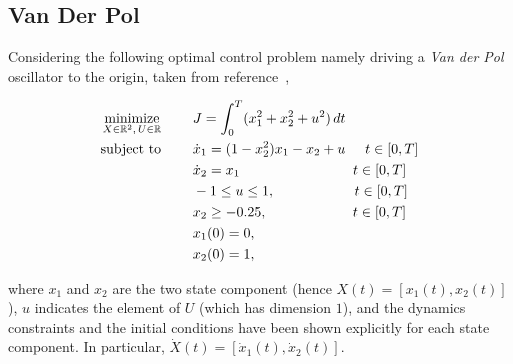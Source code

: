 \subsection*{Van Der Pol}
Considering the following optimal control problem namely
driving a \emph{Van der Pol} oscillator to the origin, taken from reference~\cite{casadi:DOC:2018},

\begin{subequations}\label{eq:vanderpol}
	\begin{align}
	\underset{X \in \mathbb{R}^{2}, \, U \in \mathbb{R}}{\text{minimize}}\hspace{8mm}
	&J = \int_{0}^{T}(x_1^{2} + x_2^{2} + u^{2})\,dt  \label{eq:vancost}\\
	\text{subject to} \hspace{8mm}
	& \dot{x}_1 = (1 - x_2^{2})x_{1} - x_2 + u \hspace{5mm} t \in[0,T] \label{eq:vandyn1}\\
	& \dot{x}_2 = x_1 \hspace{28.5mm} t \in[0,T] \label{eq:vandyn2}\\
	& -1  \leq u \leq 1,  \hspace{20mm} t \in[0,T] \label{eq:vanpath1}\\
	& x_2 \geq -0.25,  \hspace{21.5mm} t \in[0,T] \label{eq:vanpath2}\\
	& x_1(0) = 0, \label{eq:initial1}\\		
	& x_2(0) = 1, \label{eq:intial2}		
	\end{align}
\end{subequations}

where $x_1$ and $x_2$ are the two state component (hence $X(t) = [x_1(t), x_2(t)]$), $u$ indicates the element of $U$ (which has dimension $1$), and the dynamics constraints and the initial conditions have been shown explicitly for each state component. In particular, $\dot{X}(t) = [\dot{x}_1(t), \dot{x}_2(t)]$.

